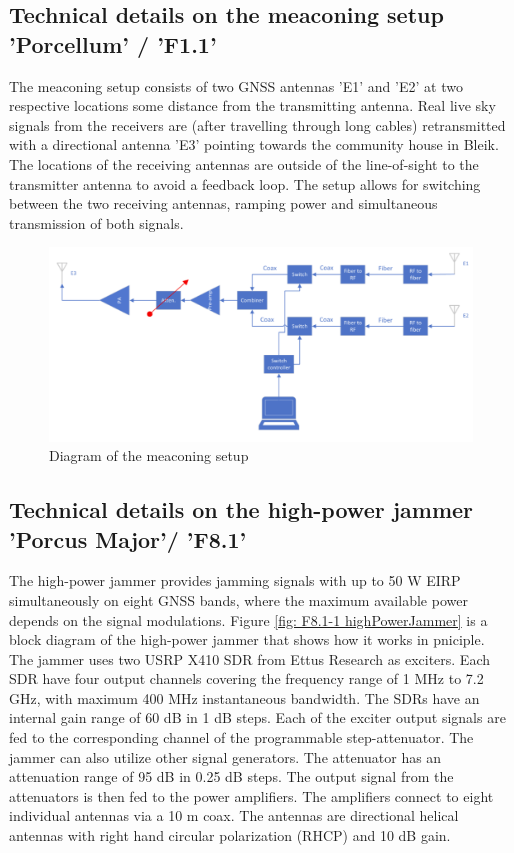 




\subsection{Technical details on the meaconing setup 'Porcellum' / 'F1.1'}
The meaconing setup consists of two GNSS antennas 'E1' and 'E2' at two respective locations some
distance from the transmitting antenna. Real live sky signals from the receivers are (after travelling
through long cables) retransmitted with a directional antenna 'E3' pointing towards the community
house in Bleik. The locations of the receiving antennas are outside of the line-of-sight to the
transmitter antenna to avoid a feedback loop. The setup allows for switching between the two
receiving antennas, ramping power and simultaneous transmission of both signals.
\begin{figure}[H]
    \includegraphics[width=\textwidth]{graphics/appendixG/meaconingSetup.png}
    \caption{Diagram of the meaconing setup}
\end{figure}

\subsection{Technical details on the high-power jammer 'Porcus Major'/ 'F8.1'}
The high-power jammer provides jamming signals with up to 50 W EIRP simultaneously on eight GNSS
bands, where the maximum available power depends on the signal modulations. Figure \ref{fig: F8.1-1 highPowerJammer} is a
block diagram of the high-power jammer that shows how it works in pniciple. The jammer uses two
USRP X410 SDR from Ettus Research as exciters. Each SDR have four output channels covering the
frequency range of 1 MHz to 7.2 GHz, with maximum 400 MHz instantaneous bandwidth. The SDRs
have an internal gain range of 60 dB in 1 dB steps. Each of the exciter output signals are fed to the
corresponding channel of the programmable step-attenuator. The jammer can also utilize other signal
generators. The attenuator has an attenuation range of 95 dB in 0.25 dB steps. The output signal from
the attenuators is then fed to the power amplifiers. The amplifiers connect to eight individual
antennas via a 10 m coax. The antennas are directional helical antennas with right hand circular
polarization (RHCP) and 10 dB gain.


